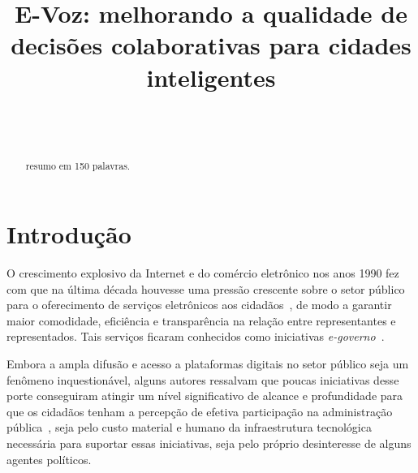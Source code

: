 \documentclass{sigchi}
\def\plaintitle{E-Voz: melhorando a qualidade de decisões colaborativas para cidades inteligentes}
\def\plainkeywords{escrever; aqui; obrigatório}
\begin{document}
\title{\plaintitle}

\author{%
  \\
  \\
}

\maketitle

\begin{abstract}
  resumo em 150 palavras.
\end{abstract}

 

\keywords{\plainkeywords}

\section{Introdução}
O crescimento explosivo da Internet e do comércio eletrônico nos anos 1990 fez com que na última década houvesse uma pressão crescente sobre o setor público para o oferecimento de serviços eletrônicos aos cidadãos~\cite{tat:2002}, de modo a garantir maior comodidade, eficiência e transparência na relação entre representantes e representados. Tais serviços ficaram conhecidos como iniciativas \textit{e-governo}~\cite{carter:2005}.

Embora a ampla difusão e acesso a plataformas digitais no setor público seja um fenômeno inquestionável, alguns autores ressalvam que poucas iniciativas desse porte conseguiram atingir um nível significativo de alcance e profundidade para que os cidadãos tenham a percepção de efetiva participação na administração pública~\cite{layne:2001}, seja pelo custo material e humano da infraestrutura tecnológica necessária para suportar essas iniciativas, seja pelo próprio desinteresse de alguns agentes políticos.
\end{document}

